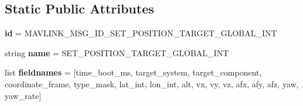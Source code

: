\subsection*{Static Public Attributes}
\begin{DoxyCompactItemize}
\item 
\mbox{\label{classpymavlink_1_1dialects_1_1v10_1_1MAVLink__set__position__target__global__int__message_aab34d1f0d0870f9a8e5119e93f5e4256}} 
{\bfseries id} = M\+A\+V\+L\+I\+N\+K\+\_\+\+M\+S\+G\+\_\+\+I\+D\+\_\+\+S\+E\+T\+\_\+\+P\+O\+S\+I\+T\+I\+O\+N\+\_\+\+T\+A\+R\+G\+E\+T\+\_\+\+G\+L\+O\+B\+A\+L\+\_\+\+I\+NT
\item 
\mbox{\label{classpymavlink_1_1dialects_1_1v10_1_1MAVLink__set__position__target__global__int__message_ab19be3caa5fb8f970d776e23e188520f}} 
string {\bfseries name} = \textquotesingle{}S\+E\+T\+\_\+\+P\+O\+S\+I\+T\+I\+O\+N\+\_\+\+T\+A\+R\+G\+E\+T\+\_\+\+G\+L\+O\+B\+A\+L\+\_\+\+I\+NT\textquotesingle{}
\item 
\mbox{\label{classpymavlink_1_1dialects_1_1v10_1_1MAVLink__set__position__target__global__int__message_af47cd00bf4ebb9dd8a4b25d68c735612}} 
list {\bfseries fieldnames} = \mbox{[}\textquotesingle{}time\+\_\+boot\+\_\+ms\textquotesingle{}, \textquotesingle{}target\+\_\+system\textquotesingle{}, \textquotesingle{}target\+\_\+component\textquotesingle{}, \textquotesingle{}coordinate\+\_\+frame\textquotesingle{}, \textquotesingle{}type\+\_\+mask\textquotesingle{}, \textquotesingle{}lat\+\_\+int\textquotesingle{}, \textquotesingle{}lon\+\_\+int\textquotesingle{}, \textquotesingle{}alt\textquotesingle{}, \textquotesingle{}vx\textquotesingle{}, \textquotesingle{}vy\textquotesingle{}, \textquotesingle{}vz\textquotesingle{}, \textquotesingle{}afx\textquotesingle{}, \textquotesingle{}afy\textquotesingle{}, \textquotesingle{}afz\textquotesingle{}, \textquotesingle{}yaw\textquotesingle{}, \textquotesingle{}yaw\+\_\+rate\textquotesingle{}\mbox{]}
\item 
\mbox{\label{classpymavlink_1_1dialects_1_1v10_1_1MAVLink__set__position__target__global__int__message_a5bc2460a74ac2712df8fb40750ce4ace}} 

\end{DoxyCompactItemize}
